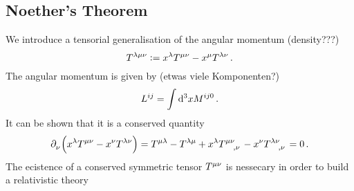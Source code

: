 \subsection{Noether's Theorem}
We introduce a tensorial generalisation of the angular momentum (density???)
\begin{equation}
\tensor{T}{^\lambda^\mu^\nu}:=
\tensor{x}{^\lambda}\tensor{T}{^\mu^\nu}-\tensor{x}{^\mu}\tensor{T}{^\lambda^\nu}\,
.
\end{equation}
The angular momentum is given by (etwas viele Komponenten?)
\begin{equation}
\tensor{L}{^i^j} = \int\dif{}^3 x \tensor{M}{^i^j^0}\, .
\end{equation}
It can be shown that it is a conserved quantity
\begin{equation}
\tensor{\partial}{_\nu}\left(\tensor{x}{^\lambda}\tensor{T}{^\mu^\nu}-\tensor{x}{^\nu}\tensor{T}{^\lambda^\nu}\right)
=\tensor{T}{^\mu^\lambda}-\tensor{T}{^\lambda^\mu}+\tensor{x}{^\lambda}
\tensor{T}{^\mu^\nu_,_\nu}-\tensor{x}{^\nu}\tensor{T}{^\lambda^\nu_,_\nu}=0\, .
\end{equation}
The ecistence of a conserved symmetric tensor $\tensor{T}{^\mu^\nu}$ is
nessecary in order to build a relativistic theory

